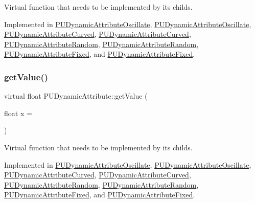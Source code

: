 Virtual function that needs to be implemented by its childs. 

Implemented in \hyperlink{classPUDynamicAttributeOscillate_aeb4b57af76effcaef69b5a305a7dd8a6}{P\+U\+Dynamic\+Attribute\+Oscillate}, \hyperlink{classPUDynamicAttributeOscillate_a01b85ebd9d38fa6d0276ae8b98337673}{P\+U\+Dynamic\+Attribute\+Oscillate}, \hyperlink{classPUDynamicAttributeCurved_a663cc23b856c6fe68913d99364666c38}{P\+U\+Dynamic\+Attribute\+Curved}, \hyperlink{classPUDynamicAttributeCurved_a07fad3406f2e08cee1249a2ae125caf7}{P\+U\+Dynamic\+Attribute\+Curved}, \hyperlink{classPUDynamicAttributeRandom_a1b96f087b10c1128f39fb4cc5f25111f}{P\+U\+Dynamic\+Attribute\+Random}, \hyperlink{classPUDynamicAttributeRandom_a40ef3a16e08b112a9130c8d5e8f76d78}{P\+U\+Dynamic\+Attribute\+Random}, \hyperlink{classPUDynamicAttributeFixed_a154eea66dacfa4c1c4c2087b84261c18}{P\+U\+Dynamic\+Attribute\+Fixed}, and \hyperlink{classPUDynamicAttributeFixed_ae4915a880ce125cbd5b123bba2966601}{P\+U\+Dynamic\+Attribute\+Fixed}.

\mbox{\label{classPUDynamicAttribute_ac478ecb2528f32b536b1faa72558c756}} 
\subsubsection{\texorpdfstring{get\+Value()}{getValue()}\hspace{0.1cm}{\footnotesize\ttfamily [2/2]}}
{\footnotesize\ttfamily virtual float P\+U\+Dynamic\+Attribute\+::get\+Value (\begin{DoxyParamCaption}\item[{float}]{x = {} }\end{DoxyParamCaption})\hspace{0.3cm}{\ttfamily [pure virtual]}}

Virtual function that needs to be implemented by its childs. 

Implemented in \hyperlink{classPUDynamicAttributeOscillate_aeb4b57af76effcaef69b5a305a7dd8a6}{P\+U\+Dynamic\+Attribute\+Oscillate}, \hyperlink{classPUDynamicAttributeOscillate_a01b85ebd9d38fa6d0276ae8b98337673}{P\+U\+Dynamic\+Attribute\+Oscillate}, \hyperlink{classPUDynamicAttributeCurved_a663cc23b856c6fe68913d99364666c38}{P\+U\+Dynamic\+Attribute\+Curved}, \hyperlink{classPUDynamicAttributeCurved_a07fad3406f2e08cee1249a2ae125caf7}{P\+U\+Dynamic\+Attribute\+Curved}, \hyperlink{classPUDynamicAttributeRandom_a1b96f087b10c1128f39fb4cc5f25111f}{P\+U\+Dynamic\+Attribute\+Random}, \hyperlink{classPUDynamicAttributeRandom_a40ef3a16e08b112a9130c8d5e8f76d78}{P\+U\+Dynamic\+Attribute\+Random}, \hyperlink{classPUDynamicAttributeFixed_a154eea66dacfa4c1c4c2087b84261c18}{P\+U\+Dynamic\+Attribute\+Fixed}, and \hyperlink{classPUDynamicAttributeFixed_ae4915a880ce125cbd5b123bba2966601}{P\+U\+Dynamic\+Attribute\+Fixed}.

